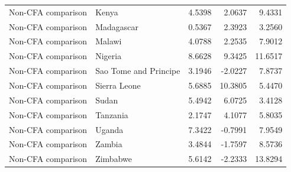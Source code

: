 \begin{table}
\begin{tabular}[t]{llrrr}
Non-CFA comparison & Kenya & 4.5398 & 2.0637 & 9.4331\\
\addlinespace
Non-CFA comparison & Madagascar & 0.5367 & 2.3923 & 3.2560\\
Non-CFA comparison & Malawi & 4.0788 & 2.2535 & 7.9012\\
Non-CFA comparison & Nigeria & 8.6628 & 9.3425 & 11.6517\\
Non-CFA comparison & Sao Tome and Principe & 3.1946 & -2.0227 & 7.8737\\
Non-CFA comparison & Sierra Leone & 5.6885 & 10.3805 & 5.4470\\
\addlinespace
Non-CFA comparison & Sudan & 5.4942 & 6.0725 & 3.4128\\
Non-CFA comparison & Tanzania & 2.1747 & 4.1077 & 5.8035\\
Non-CFA comparison & Uganda & 7.3422 & -0.7991 & 7.9549\\
Non-CFA comparison & Zambia & 3.4844 & -1.7597 & 8.5736\\
Non-CFA comparison & Zimbabwe & 5.6142 & -2.2333 & 13.8294\\
\bottomrule
\end{tabular}
\end{table}